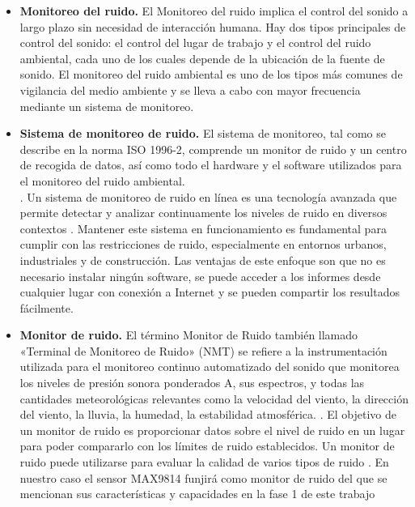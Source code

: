 {{\begin{itemize}
    \item \textbf{Monitoreo del ruido.} El Monitoreo del ruido implica el control del sonido a largo plazo sin necesidad de interacción humana. Hay dos tipos principales de control del sonido: el control del lugar de trabajo y el control del ruido ambiental, cada uno de los cuales depende de la ubicación de la fuente de sonido. El monitoreo del ruido ambiental es uno de los tipos más comunes de vigilancia del medio ambiente y se lleva a cabo con mayor frecuencia mediante un sistema de monitoreo.\parencite{Svantek2025MonitoreoDelRuido}
    \vspace{1cm}
    \item \textbf{Sistema de monitoreo de ruido.} El sistema de monitoreo, tal como se describe en la norma ISO 1996-2, comprende un monitor de ruido y un centro de recogida de datos, así como todo el hardware y el software utilizados para el monitoreo del ruido ambiental. \\\parencite{Svantek2025MonitoreoDelRuido}. 
    Un sistema de monitoreo de ruido en línea es una tecnología avanzada que permite detectar y analizar continuamente los niveles de ruido en diversos contextos . Mantener este sistema en funcionamiento es fundamental para cumplir con las restricciones de ruido, especialmente en entornos urbanos, industriales y de construcción. Las ventajas de este enfoque son que no es necesario instalar ningún software, se puede acceder a los informes desde cualquier lugar con conexión a Internet y se pueden compartir los resultados fácilmente. \parencite{AdvanceTech2024}
    \vspace{1cm}
    \item \textbf{Monitor de ruido.} El término Monitor de Ruido también llamado «Terminal de Monitoreo de Ruido» (NMT) se refiere a la instrumentación utilizada para el monitoreo continuo automatizado del sonido que monitorea los niveles de presión sonora ponderados A, sus espectros, y todas las cantidades meteorológicas relevantes como la velocidad del viento, la dirección del viento, la lluvia, la humedad, la estabilidad atmosférica. \parencite{Svantek2025MonitoreoDelRuido}. El objetivo de un monitor de ruido es proporcionar datos sobre el nivel de ruido en un lugar para poder compararlo con los límites de ruido establecidos. Un monitor de ruido puede utilizarse para evaluar la calidad de varios tipos de ruido \parencite{Svantek2025MonitoreoDelRuido}. En nuestro caso el sensor MAX9814 funjirá como monitor de ruido del que se mencionan sus características y capacidades en la fase 1 de este trabajo \parencite{carpio2025}


\end{itemize}}}
